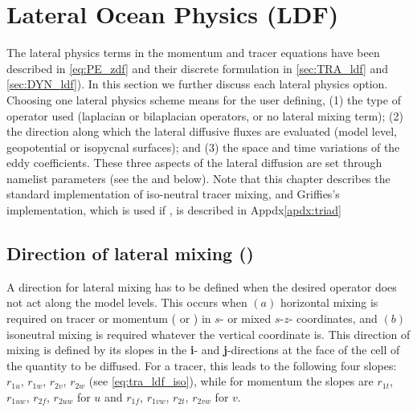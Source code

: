 \documentclass[../main/NEMO_manual]{subfiles}
\begin{document}
\chapter{Lateral Ocean Physics (LDF)}
\label{chap:LDF}

\minitoc

\newpage

The lateral physics terms in the momentum and tracer equations have been described in \autoref{eq:PE_zdf} and
their discrete formulation in \autoref{sec:TRA_ldf} and \autoref{sec:DYN_ldf}).
In this section we further discuss each lateral physics option.
Choosing one lateral physics scheme means for the user defining,
(1) the type of operator used (laplacian or bilaplacian operators, or no lateral mixing term);
(2) the direction along which the lateral diffusive fluxes are evaluated
(model level, geopotential or isopycnal surfaces); and
(3) the space and time variations of the eddy coefficients.
These three aspects of the lateral diffusion are set through namelist parameters
(see the  and  below).
Note that this chapter describes the standard implementation of iso-neutral tracer mixing,
and Griffies's implementation, which is used if ,
is described in Appdx\autoref{apdx:triad}





\section{Direction of lateral mixing (\protect{})}
\label{sec:LDF_slp}


A direction for lateral mixing has to be defined when the desired operator does not act along the model levels.
This occurs when $(a)$ horizontal mixing is required on tracer or momentum
( or ) in $s$- or mixed $s$-$z$- coordinates,
and $(b)$ isoneutral mixing is required whatever the vertical coordinate is.
This direction of mixing is defined by its slopes in the \textbf{i}- and \textbf{j}-directions at the face of
the cell of the quantity to be diffused.
For a tracer, this leads to the following four slopes:
$r_{1u}$, $r_{1w}$, $r_{2v}$, $r_{2w}$ (see \autoref{eq:tra_ldf_iso}),
while for momentum the slopes are  $r_{1t}$, $r_{1uw}$, $r_{2f}$, $r_{2uw}$ for $u$ and
$r_{1f}$, $r_{1vw}$, $r_{2t}$, $r_{2vw}$ for $v$. 
\end{document}
